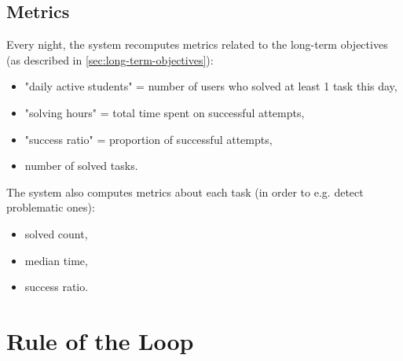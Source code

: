 \subsection{Metrics}
\label{sec:robomission.metrics}

Every night, the system recomputes metrics related to the long-term objectives
(as described in \ref{sec:long-term-objectives}):

\begin{itemize}
\item "daily active students" = number of users who solved at least 1 task this day,
\item "solving hours" = total time spent on successful attempts,
\item "success ratio" = proportion of successful attempts,
\item number of solved tasks.
\end{itemize}


The system also computes metrics about each task (in order to e.g. detect problematic ones):
\begin{itemize}
\item solved count,
\item median time,
\item success ratio.
\end{itemize}




%


\section{Rule of the Loop}
\label{sec:robomission.rule-of-the-loop}

